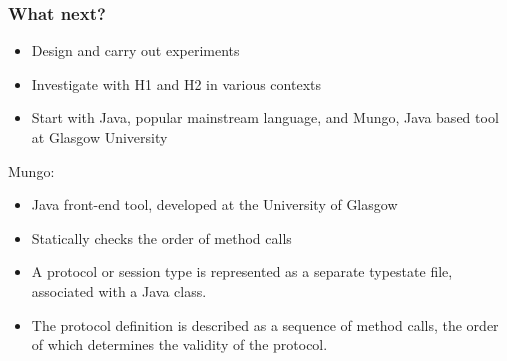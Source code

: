 %

\begin{frame}\frametitle{What next?}
  \begin{itemize}
    \item Design and carry out experiments
    \item Investigate with H1 and H2 in various contexts
    \item Start with Java, popular mainstream language, and Mungo, Java based tool at Glasgow University
  \end{itemize}

  Mungo:
  \begin{itemize}
    \item Java front-end tool, developed at the University of Glasgow
    \item Statically checks the order of method calls
    \item A protocol or session type is represented as a separate typestate file, associated with a Java class.
    \item The protocol definition is described as a sequence of method calls, the order of which determines the validity of the protocol.

  \end{itemize}
\end{frame}


